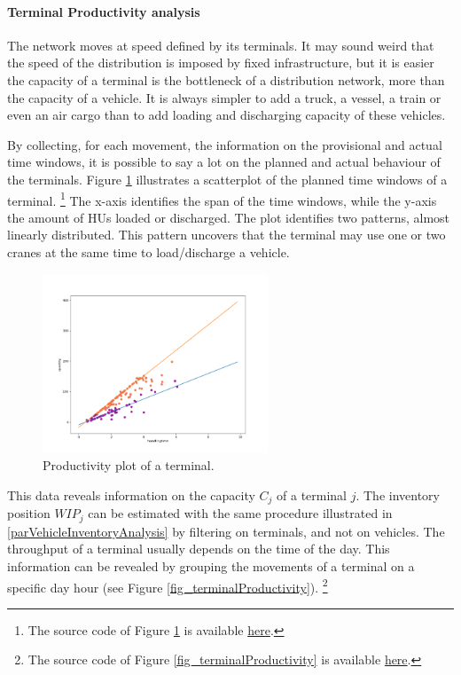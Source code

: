 \paragraph{Terminal Productivity analysis}
The network moves at speed defined by its terminals. It may sound weird that the speed of the distribution is imposed by fixed infrastructure, but it is easier the capacity of a terminal is the bottleneck of a distribution network, more than the capacity of a vehicle. It is always simpler to add a truck, a vessel, a train or even an air cargo than to add loading and discharging capacity of these vehicles.\par

By collecting, for each movement, the information on the provisional and actual time windows, it is possible to say a lot on the planned and actual behaviour of the terminals. Figure \ref{fig_terminalLinearProductivity} illustrates a scatterplot of the planned time windows of a terminal. \footnote{The source code of Figure \ref{fig_terminalLinearProductivity} is available \href{https://github.com/aletuf93/logproj/blob/master/examples/DIST_01\%20Supply\%20Chain\%20Assessment.ipynb}{here}.} The x-axis identifies the span of the time windows, while the y-axis the amount of HUs loaded or discharged. The plot identifies two patterns, almost linearly distributed. This pattern uncovers that the terminal may use one or two cranes at the same time to load/discharge a vehicle.

\begin{figure}[hbt!]
\centering
\includegraphics[width=0.6\textwidth]{SectionDistribution/control_figures/fig_terminalLinearProductivity.png}
\captionsetup{type=figure}
\caption{Productivity plot of a terminal.}
\label{fig_terminalLinearProductivity}
\end{figure}

This data reveals information on the capacity $C_j$ of a terminal $j$. The inventory position $WIP_j$ can be estimated with the same procedure illustrated in \ref{parVehicleInventoryAnalysis} by filtering on terminals, and not on vehicles. The throughput of a terminal usually depends on the time of the day. This information can be revealed by grouping the movements of a terminal on a specific day hour (see Figure \ref{fig_terminalProductivity}). \footnote{The source code of Figure \ref{fig_terminalProductivity} is available \href{https://github.com/aletuf93/logproj/blob/master/examples/DIST_01\%20Supply\%20Chain\%20Assessment.ipynb}{here}.}

